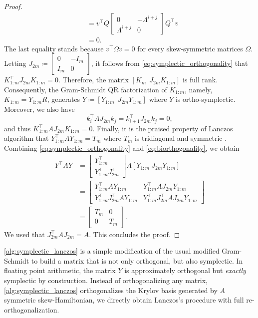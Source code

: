 \documentclass[10pt,twoside,dvipsnames]{siamart1116}
\numberwithin{algorithm}{section}
\numberwithin{equation}{section}
\begin{document}
\begin{proof}
\begin{align}
	&=v^\top Q\begin{bmatrix}
		0&-\Lambda^{i+j}\\
		\Lambda^{i+j}&0
		\end{bmatrix}Q^\top v\\
\label{eq:symplectic_orthogonality}
		&=0.
	\end{align}
	The last equality stands because $v^\top \Omega v=0$ for every skew-symmetric matrices $\Omega$. Letting $J_{2m}\coloneq\left[\begin{smallmatrix}
		0&-I_m\\
		I_m&0
		\end{smallmatrix}\right]$, it follows from \eqref{eq:symplectic_orthogonality} that $K_{1:m}^\top J_{2m}K_{1:m}=0$. Therefore, the matrix $[K_m\ \ J_{2m}K_{1:m}]$ is full rank. Consequently, the Gram-Schmidt QR factorization of $K_{1:m}$, namely, $K_{1:m} = Y_{1:m}R$, generates $Y\coloneq[Y_{1:m}\ \ J_{2m} Y_{1:m}]$ where $Y$ is ortho-symplectic. Moreover, we also have 
	\begin{equation}\label{eq:biorthogonality}
	k_i^\top  A J_{2m} k_j = k_{i+1}^\top  J_{2m}k_j = 0, 
\end{equation}
and thus $K_{1:m}^\top AJ_{2m}K_{1:m} = 0$. Finally, it is the praised property of Lanczos algorithm that $Y_{1:m}^\top AY_{1:m} = T_m$ where $T_m$ is tridiagonal and symmetric \cite[Thm.~9.1.1]{GoluVanl96}. Combining \eqref{eq:symplectic_orthogonality} and \eqref{eq:biorthogonality}, we obtain
		\begin{align*}
		Y^\top AY &= \begin{bmatrix}
		Y_{1:m}^\top \\
		Y_{1:m}^\top J_{2m}^\top 
		\end{bmatrix}A [Y_{1:m} \ J_{2m}Y_{1:m}]\\
		&=\begin{bmatrix}
		Y_{1:m}^\top AY_{1:m}&Y_{1:m}^\top AJ_{2m}Y_{1:m}\\
		Y_{1:m}^\top J_{2m}^\top AY_{1:m}&Y_{1:m}^\top J_{2m}^\top AJ_{2m}Y_{1:m}
		\end{bmatrix}\\
		& = \begin{bmatrix}
		T_m&0\\
		0&T_m
		\end{bmatrix}.
		\end{align*}
		We used that $J_{2m}^\top AJ_{2m}=A$. This concludes the proof.
	\end{proof}
\cref{alg:symplectic_lanczos} is a simple modification of the usual modified Gram-Schmidt to build a matrix that is not only orthogonal, but also symplectic. In floating point arithmetic, the matrix $Y$ is approximately orthogonal but \emph{exactly} symplectic by construction. Instead of orthogonalizing any matrix, \cref{alg:symplectic_lanczos} orthogonalizes the Krylov basis generated by $A$ symmetric skew-Hamiltonian, we directly obtain Lanczos's procedure with full re-orthogonalization. 
	
\end{document}
